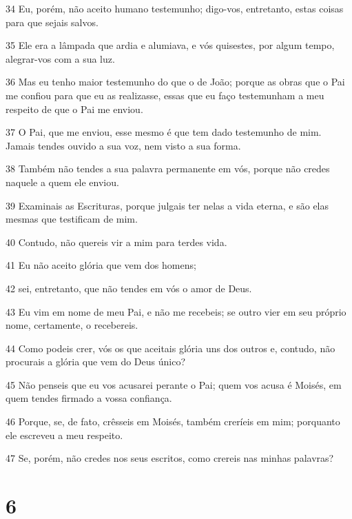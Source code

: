 \par 34 Eu, porém, não aceito humano testemunho; digo-vos, entretanto, estas coisas para que sejais salvos.
\par 35 Ele era a lâmpada que ardia e alumiava, e vós quisestes, por algum tempo, alegrar-vos com a sua luz.
\par 36 Mas eu tenho maior testemunho do que o de João; porque as obras que o Pai me confiou para que eu as realizasse, essas que eu faço testemunham a meu respeito de que o Pai me enviou.
\par 37 O Pai, que me enviou, esse mesmo é que tem dado testemunho de mim. Jamais tendes ouvido a sua voz, nem visto a sua forma.
\par 38 Também não tendes a sua palavra permanente em vós, porque não credes naquele a quem ele enviou.
\par 39 Examinais as Escrituras, porque julgais ter nelas a vida eterna, e são elas mesmas que testificam de mim.
\par 40 Contudo, não quereis vir a mim para terdes vida.
\par 41 Eu não aceito glória que vem dos homens;
\par 42 sei, entretanto, que não tendes em vós o amor de Deus.
\par 43 Eu vim em nome de meu Pai, e não me recebeis; se outro vier em seu próprio nome, certamente, o recebereis.
\par 44 Como podeis crer, vós os que aceitais glória uns dos outros e, contudo, não procurais a glória que vem do Deus único?
\par 45 Não penseis que eu vos acusarei perante o Pai; quem vos acusa é Moisés, em quem tendes firmado a vossa confiança.
\par 46 Porque, se, de fato, crêsseis em Moisés, também creríeis em mim; porquanto ele escreveu a meu respeito.
\par 47 Se, porém, não credes nos seus escritos, como crereis nas minhas palavras?

\chapter{6}

